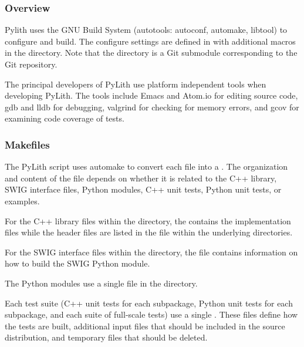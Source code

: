 
\subsubsection{Overview}

Pylith uses the GNU Build System (autotools: autoconf, automake,
libtool) to configure and build. The configure settings are defined in
 with additional macros in the 
directory. Note that the  directory is a Git submodule
corresponding to the  Git repository.

The principal developers of PyLith use platform independent tools when
developing PyLith. The tools include Emacs and Atom.io for editing
source code, gdb and lldb for debugging, valgrind for checking for
memory errors, and gcov for examining code coverage of tests.

\subsubsection{Makefiles}

The PyLith  script uses automake to convert each
 file into a . The
organization and content of the  file depends on
whether it is related to the C++ library, SWIG interface files, Python
modules, C++ unit tests, Python unit tests, or examples.

For the C++ library files within the  directory, the
 contains the implementation files while
the header files are listed in the  file within
the underlying directories.

For the SWIG interface files within the 
directory, the  file contains information on how
to build the SWIG Python module.

The Python modules use a single  file in
the  directory.

Each test suite (C++ unit tests for each subpackage, Python unit tests
for each subpackage, and each suite of full-scale tests) use a single
. These files define how the tests are built,
additional input files that should be included in the source
distribution, and temporary files that should be deleted.

